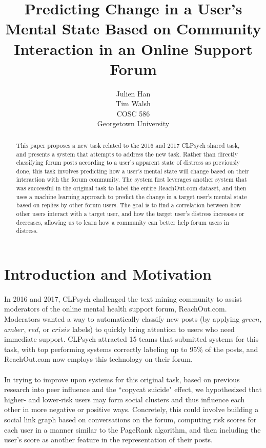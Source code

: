 \documentclass{article}
\begin{document}
\title{Predicting Change in a User's Mental State Based on Community Interaction in an Online Support Forum}
\author{
Julien Han\\
Tim Walsh\\
COSC 586\\
Georgetown University\\
}
\maketitle

\begin{abstract}
This paper proposes a new task related to the 2016 and 2017 CLPsych shared task, and presents a system that attempts to address the new task. Rather than directly classifying forum posts according to a user's apparent state of distress as previously done, this task involves predicting how a user's mental state will change based on their interaction with the forum community. The system first leverages another system that was successful in the original task to label the entire ReachOut.com dataset, and then uses a machine learning approach to predict the change in a target user's mental state based on replies by other forum users. The goal is to find a correlation between how other users interact with a target user, and how the target user's distress increases or decreases, allowing us to learn how a community can better help forum users in distress.
\end{abstract}

\section{Introduction and Motivation}

\paragraph{}In 2016 and 2017, CLPsych challenged the text mining community to assist moderators of the online mental health support forum, ReachOut.com. Moderators wanted a way to automatically classify new posts (by applying $green$, $amber$, $red$, or $crisis$ labels) to quickly bring attention to users who need immediate support. CLPsych attracted 15 teams that submitted systems for this task, with top performing systems correctly labeling up to 95\% of the posts, and ReachOut.com now employs this technology on their forum\cite{milne}\cite{cohan2}.

\paragraph{}In trying to improve upon systems for this original task, based on previous research into peer influence and the ``copycat suicide" effect, we hypothesized that higher- and lower-risk users may form social clusters and thus influence each other in more negative or positive ways\cite{gladwell}\cite{phillips}\cite{stack}. Concretely, this could involve building a social link graph based on conversations on the forum, computing risk scores for each user in a manner similar to the PageRank algorithm, and then including the user's score as another feature in the representation of their posts.
\end{document}
